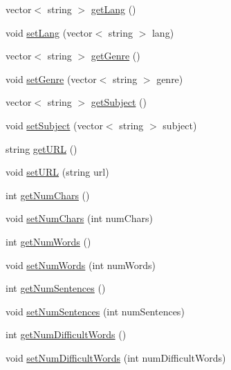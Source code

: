 \begin{DoxyCompactItemize}
\item 
vector$<$ string $>$ \mbox{\hyperlink{classbridges_1_1_book_afe447c2884d59df17bed7ba2a4dc38a9}{get\+Lang}} ()
\item 
void \mbox{\hyperlink{classbridges_1_1_book_acec57a03086884a8ebae4c608c19e5cf}{set\+Lang}} (vector$<$ string $>$ lang)
\item 
vector$<$ string $>$ \mbox{\hyperlink{classbridges_1_1_book_ac3c2724781fdd331946a1c2eb7c3d9b7}{get\+Genre}} ()
\item 
void \mbox{\hyperlink{classbridges_1_1_book_a599852c24b9093e04fb124f21cb31419}{set\+Genre}} (vector$<$ string $>$ genre)
\item 
vector$<$ string $>$ \mbox{\hyperlink{classbridges_1_1_book_aea7da4cd608fbccf1742f64913a314c0}{get\+Subject}} ()
\item 
void \mbox{\hyperlink{classbridges_1_1_book_a9ee227f750be7ab000fb30cf361a8f5c}{set\+Subject}} (vector$<$ string $>$ subject)
\item 
string \mbox{\hyperlink{classbridges_1_1_book_ade9cece412cf86a8d2e7a29c308c276a}{get\+U\+RL}} ()
\item 
void \mbox{\hyperlink{classbridges_1_1_book_a4a96a6bd3956056b450c9df13e976a5a}{set\+U\+RL}} (string url)
\item 
int \mbox{\hyperlink{classbridges_1_1_book_ad84753469316165a26e33abfe7d61861}{get\+Num\+Chars}} ()
\item 
void \mbox{\hyperlink{classbridges_1_1_book_a31f85f174ab86e6f9eb2131c3dbe1cdf}{set\+Num\+Chars}} (int num\+Chars)
\item 
int \mbox{\hyperlink{classbridges_1_1_book_af3810d4dab23944d6cb83f6fb3a627d7}{get\+Num\+Words}} ()
\item 
void \mbox{\hyperlink{classbridges_1_1_book_acbed3f0ff253868d8747826a27ef30ac}{set\+Num\+Words}} (int num\+Words)
\item 
int \mbox{\hyperlink{classbridges_1_1_book_aef8e6b378e0d86124f79ea1283666333}{get\+Num\+Sentences}} ()
\item 
void \mbox{\hyperlink{classbridges_1_1_book_af16061c14c40b1672c7801a4c3a2d33b}{set\+Num\+Sentences}} (int num\+Sentences)
\item 
int \mbox{\hyperlink{classbridges_1_1_book_ae8e8b7b3b12e86ac7bb121aca1a14512}{get\+Num\+Difficult\+Words}} ()
\item 
void \mbox{\hyperlink{classbridges_1_1_book_adc7a54f2a494aeac02cadb3eb4caedbc}{set\+Num\+Difficult\+Words}} (int num\+Difficult\+Words)
\end{DoxyCompactItemize}


